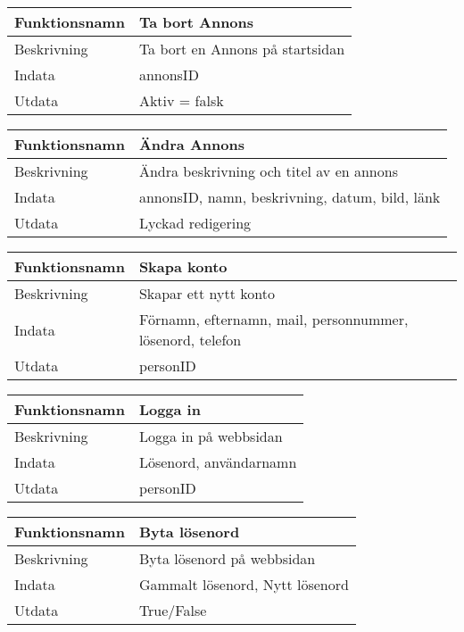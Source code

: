 \documentclass[11pt, titlepage, oneside, a4paper]{article}	%
\begin{document}
\begin{tabular}{ll}
\hline
Funktionsnamn & Ta bort Annons                        \\ \hline
Beskrivning   & Ta bort en Annons på startsidan \\ \hline
Indata        & annonsID         \\ \hline
Utdata        & Aktiv = falsk                              \\ \hline
\end{tabular}

\begin{tabular}{ll}
\hline
Funktionsnamn & Ändra Annons                       \\ \hline
Beskrivning   & Ändra beskrivning och titel av en annons \\ \hline
Indata        & annonsID, namn, beskrivning, datum, bild, länk   \\ \hline
Utdata        & Lyckad redigering                             \\ \hline
\end{tabular}

\begin{tabular}{ll}
\hline
Funktionsnamn & Skapa konto                     \\ \hline
Beskrivning   & Skapar ett nytt konto \\ \hline
Indata        & Förnamn, efternamn, mail, personnummer, lösenord, telefon   \\ \hline
Utdata        & personID              \\ \hline
\end{tabular}

\begin{tabular}{ll}
\hline
Funktionsnamn & Logga in                     \\ \hline
Beskrivning   & Logga in på webbsidan \\ \hline
Indata        & Lösenord, användarnamn   \\ \hline
Utdata        & personID              \\ \hline
\end{tabular}

\begin{tabular}{ll}
\hline
Funktionsnamn & Byta lösenord                    \\ \hline
Beskrivning   & Byta lösenord på webbsidan \\ \hline
Indata        & Gammalt lösenord, Nytt lösenord   \\ \hline
Utdata        & True/False              \\ \hline
\end{tabular}
\end{document}
